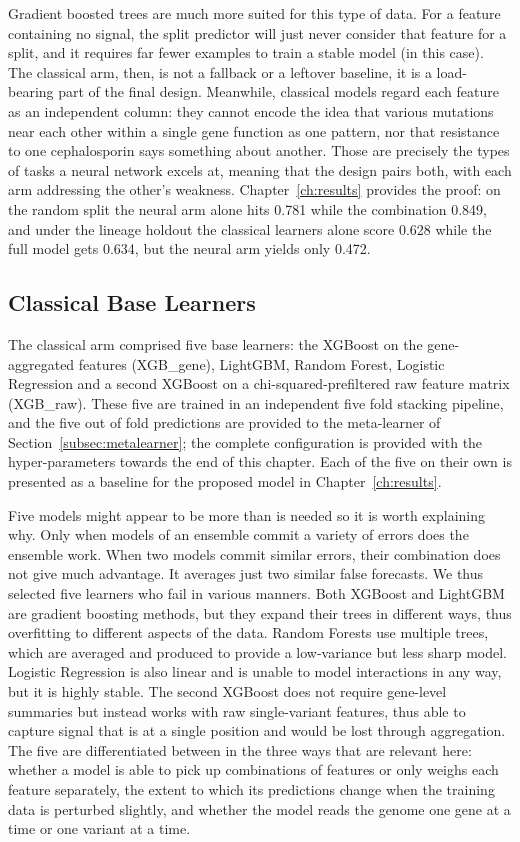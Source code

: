 Gradient boosted trees are much more suited for this type of data. For a feature containing no
signal, the split predictor will just never consider that feature for a split, and it requires
far fewer examples to train a stable model (in this case). The classical arm, then, is not a
fallback or a leftover baseline, it is a load-bearing part of the final design. Meanwhile,
classical models regard each feature as an independent column: they cannot encode the idea
that various mutations near each other within a single gene function as one pattern, nor that
resistance to one cephalosporin says something about another. Those are precisely the types
of tasks a neural network excels at, meaning that the design pairs both, with each arm
addressing the other's weakness. Chapter~\ref{ch:results} provides the proof: on the random
split the neural arm alone hits 0.781 while the combination 0.849, and under the lineage
holdout the classical learners alone score 0.628 while the full model gets 0.634, but the
neural arm yields only 0.472.

\FloatBarrier
\subsection{Classical Base Learners}

The classical arm comprised five base learners: the XGBoost on the gene-aggregated features
(XGB\_gene), LightGBM, Random Forest, Logistic Regression and a second XGBoost on a
chi-squared-prefiltered raw feature matrix (XGB\_raw). These five are trained in an independent
five fold stacking pipeline, and the five out of fold predictions are provided to the
meta-learner of Section~\ref{subsec:metalearner}; the complete configuration is provided with
the hyper-parameters towards the end of this chapter. Each of the five on their own is
presented as a baseline for the proposed model in Chapter~\ref{ch:results}.

Five models might appear to be more than is needed so it is worth explaining why. Only when models of an ensemble commit a variety of errors does the ensemble work. When two
models commit similar errors, their combination does not give much advantage. It averages just
two similar false forecasts. We thus selected five
learners who fail in various manners. Both XGBoost and LightGBM are gradient boosting methods,
but they expand their trees in different ways, thus overfitting to different aspects of the
data. Random Forests use multiple trees, which are averaged and produced to provide a
low-variance but less sharp model. Logistic Regression is also linear and is unable to model
interactions in any way, but it is highly stable. The second XGBoost does not require
gene-level summaries but instead works with raw single-variant features, thus able to capture
signal that is at a single position and would be lost through aggregation. The five are
differentiated between in the three ways that are relevant here: whether a model is able to
pick up combinations of features or only weighs each feature separately, the extent to which
its predictions change when the training data is perturbed slightly, and whether the model
reads the genome one gene at a time or one variant at a time.

